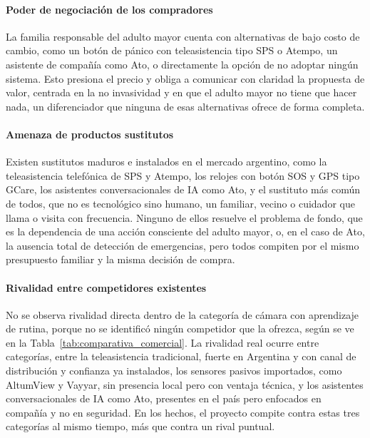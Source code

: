 \paragraph{Poder de negociación de los compradores}
La familia responsable del adulto mayor cuenta con alternativas de bajo costo de cambio, como un botón de pánico con teleasistencia tipo SPS o Atempo, un asistente de compañía como Ato, o directamente la opción de no adoptar ningún sistema.
Esto presiona el precio y obliga a comunicar con claridad la propuesta de valor, centrada en la no invasividad y en que el adulto mayor no tiene que hacer nada, un diferenciador que ninguna de esas alternativas ofrece de forma completa.

\paragraph{Amenaza de productos sustitutos}
Existen sustitutos maduros e instalados en el mercado argentino, como la teleasistencia telefónica de SPS y Atempo, los relojes con botón SOS y GPS tipo GCare, los asistentes conversacionales de IA como Ato, y el sustituto más común de todos, que no es tecnológico sino humano, un familiar, vecino o cuidador que llama o visita con frecuencia.
Ninguno de ellos resuelve el problema de fondo, que es la dependencia de una acción consciente del adulto mayor, o, en el caso de Ato, la ausencia total de detección de emergencias, pero todos compiten por el mismo presupuesto familiar y la misma decisión de compra.

\paragraph{Rivalidad entre competidores existentes}
No se observa rivalidad directa dentro de la categoría de cámara con aprendizaje de rutina, porque no se identificó ningún competidor que la ofrezca, según se ve en la Tabla~\ref{tab:comparativa_comercial}.
La rivalidad real ocurre entre categorías, entre la teleasistencia tradicional, fuerte en Argentina y con canal de distribución y confianza ya instalados, los sensores pasivos importados, como AltumView y Vayyar, sin presencia local pero con ventaja técnica, y los asistentes conversacionales de IA como Ato, presentes en el país pero enfocados en compañía y no en seguridad.
En los hechos, el proyecto compite contra estas tres categorías al mismo tiempo, más que contra un rival puntual.

\medskip

